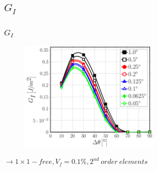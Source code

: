 \documentclass[first,firstsupp,lastsupp,last,hyperref,table]{ETHclass}
\begin{document}
\subsection{$G_{I}$}

%

\begin{frame}
\frametitle{\vspace{0.25cm}\small $G_{I}$}
\vspace{-.75cm}
\centering
\begin{figure}
\centering
\includegraphics[width=0.6\textwidth]{Vf0_1-free-2nd-GI.pdf}
\end{figure}
$\rightarrow 1\times1-free, V_{f}=0.1\%, 2^{nd}\ order\ elements$ 
\end{frame}

%
%
%
\end{document}
